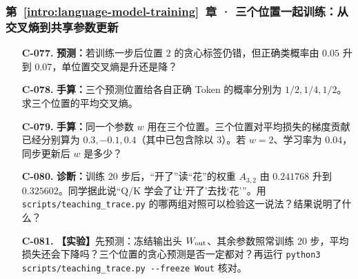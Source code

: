 \subsubsection*{第~\ref*{intro:language-model-training}~章 · 三个位置一起训练：从交叉熵到共享参数更新}
\begin{enumerate}[label={},leftmargin=4.8em,itemsep=4pt]
\item[\textbf{C-077.}] \leavevmode{}\label{exercise:C-077}\label{exercise:correct-probability-loss}\textbf{预测：}若训练一步后位置 $2$ 的贪心标签仍错，但正确类概率由 $0.05$ 升到 $0.07$，单位置交叉熵是升还是降？
\item[\textbf{C-078.}] \leavevmode{}\label{exercise:C-078}\label{exercise:joint-loss-average}\textbf{手算：}三个预测位置给各自正确 Token 的概率分别为 $1/2,1/4,1/2$。求三个位置的平均交叉熵。
\item[\textbf{C-079.}] \leavevmode{}\label{exercise:C-079}\label{exercise:shared-parameter-gradient-sum}\textbf{手算：}同一个参数 $w$ 用在三个位置。三个位置对平均损失的梯度贡献已经分别算为 $0.3,-0.1,0.4$（其中已包含除以 $3$）。若 $w=2$、学习率为 $0.04$，同步更新后 $w$ 是多少？
\item[\textbf{C-080.}] \leavevmode{}\label{exercise:C-080}\label{exercise:attention-attribution}\textbf{诊断：}训练 20 步后，“开了”读“花”的权重 $A_{3,2}$ 由 $0.241768$ 升到 $0.325602$。同学据此说“Q/K 学会了让‘开了’去找‘花’”。用 \texttt{scripts/teaching\_trace.py} 的哪两组对照可以检验这一说法？结果说明了什么？
\item[\textbf{C-081.}] \leavevmode{}\label{exercise:C-081}\label{exercise:frozen-output-head-training}\textbf{【实验】}先预测：冻结输出头 $W_{\rm out}$、其余参数照常训练 20 步，平均损失还会下降吗？三个位置的贪心预测是否一定都对？再运行 \texttt{python3 scripts/teaching\_trace.py -{}-freeze Wout} 核对。

\end{enumerate}

